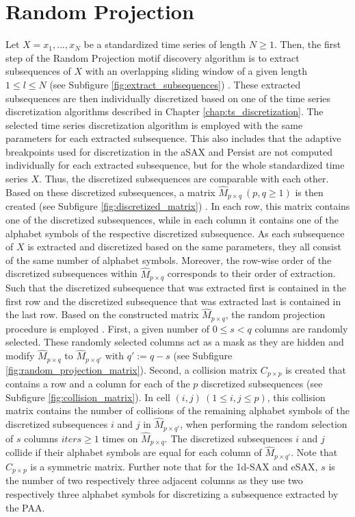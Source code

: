 \newpage
\section{Random Projection} \label{description_random_projection}
Let $X = x_1, ..., x_N$ be a standardized time series of length $N \geq 1$. Then, the first step of the Random Projection motif discovery algorithm is to extract subsequences of $X$ with an overlapping sliding window of a given length $1 \leq l \leq N$ (see Subfigure \ref{fig:extract_subsequences}) \cite{Random_Projection}. These extracted subsequences are then individually discretized based on one of the time series discretization algorithms described in Chapter \ref{chap:ts_discretization}. The selected time series discretization algorithm is employed with the same parameters for each extracted subsequence. This also includes that the adaptive breakpoints used for discretization in the \ac{aSAX} and Persist are not computed individually for each extracted subsequence, but for the whole standardized time series $X$. Thus, the discretized subsequences are comparable with each other. \newline
Based on these discretized subsequences, a matrix $\hat{M}_{p \times q} \ (p,q \geq 1)$ is then created (see Subfigure \ref{fig:discretized_matrix}) \cite{Random_Projection}. In each row, this matrix contains one of the discretized subsequences, while in each column it contains one of the alphabet symbols of the respective discretized subsequence. As each subsequence of $X$ is extracted and discretized based on the same parameters, they all consist of the same number of alphabet symbols. Moreover, the row-wise order of the discretized subsequences within $\hat{M}_{p \times q}$ corresponds to their order of extraction. Such that the discretized subsequence that was extracted first is contained in the first row and the discretized subsequence that was extracted last is contained in the last row. \newline
Based on the constructed matrix $\hat{M}_{p \times q}$, the random projection procedure is employed \cite{Random_Projection}. First, a given number of $0 \leq s < q$ columns are randomly selected. These randomly selected columns act as a mask as they are hidden and modify $\hat{M}_{p \times q}$ to $\hat{M}_{p \times q'}$ with $q' := q-s$ (see Subfigure \ref{fig:random_projection_matrix}). Second, a collision matrix $C_{p \times p}$ is created that contains a row and a column for each of the $p$ discretized subsequences (see Subfigure \ref{fig:collision_matrix}). In cell $(i,j) \ (1 \leq i,j \leq p)$, this collision matrix contains the number of collisions of the remaining alphabet symbols of the discretized subsequences $i$ and $j$ in $\hat{M}_{p \times q'}$, when performing the random selection of $s$ columns $iters \geq 1$ times on $\hat{M}_{p \times q}$. The discretized subsequences $i$ and $j$ collide if their alphabet symbols are equal for each column of $\hat{M}_{p \times q'}$. Note that $C_{p \times p}$ is a symmetric matrix. Further note that for the \ac{1d-SAX} and {eSAX}, $s$ is the number of two respectively three adjacent columns as they use two respectively three alphabet symbols for discretizing a subsequence extracted by the \ac{PAA}. \newline
